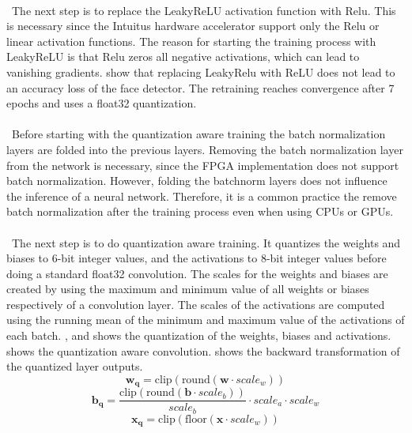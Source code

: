 \documentclass[%
a4paper,
twoside,
openany,
dvipsnames
]
{report}
\begin{document}
	\\\
	The next step is to replace the LeakyReLU activation function with \gls{Relu}. This is necessary since the Intuitus hardware accelerator support only the \gls{Relu} or linear activation functions. The reason for starting the training process with LeakyReLU is that \gls{Relu} zeros all negative activations, which can lead to vanishing gradients.  show that replacing LeakyRelu with ReLU does not lead to an accuracy loss of the face detector. The retraining reaches convergence after 7 epochs and uses a float32 quantization. \\
	\\\
	Before starting with the quantization aware training the batch normalization layers are folded into the previous layers. Removing the batch normalization layer from the network is necessary, since the \gls{FPGA} implementation does not support batch normalization. However, folding the batchnorm layers does not influence the inference of a neural network. Therefore, it is a common practice the remove batch normalization after the training process even when using \glspl{CPU} or \glspl{GPU}.\\
	\\\
	The next step is to do quantization aware training. It quantizes the weights and biases to 6-bit integer values, and the activations to 8-bit integer values before doing a standard float32 convolution. The scales for the weights and biases are created by using the maximum and minimum value of all weights or biases respectively of a convolution layer. The scales of the activations are computed using the running mean of the minimum and maximum value of the activations of each batch. ,  and  shows the quantization of the weights, biases and activations.  shows the quantization aware convolution.  shows the backward transformation of the quantized layer outputs.   
	\begin{equation} \label{eq:w-q}
		\mathbf{w_{q}} = \text{clip}(\text{round}(\mathbf{w} \cdot scale_w)) 
	\end{equation}
	\begin{equation} \label{eq:b-q}
		\mathbf{b_q} = \frac{\text{clip}(\text{round}(\mathbf{b} \cdot  scale_b))}{scale_b} \cdot scale_a \cdot scale_w 
	\end{equation}
	\begin{equation} \label{eq:x-q}
		\mathbf{x_q} = \text{clip}(\text{floor}(\mathbf{x} \cdot scale_w))
	\end{equation}
\end{document}
